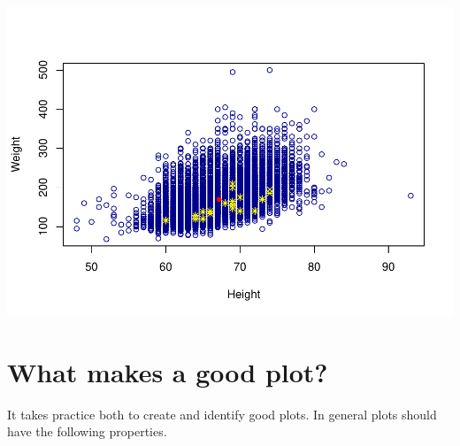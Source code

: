 \documentclass[
]{book}
\begin{document}
\includegraphics{_main_files/figure-latex/unnamed-chunk-189-1.pdf}

\hypertarget{what-makes-a-good-plot}{%
\section{What makes a good plot?}\label{what-makes-a-good-plot}}

It takes practice both to create and identify good plots. In general plots should have the following properties.
\end{document}
